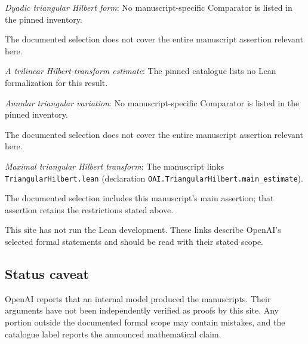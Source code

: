 \documentclass[11pt]{article}
\begin{document}
\textit{Dyadic triangular Hilbert form}: No manuscript-specific Comparator is listed in the pinned inventory.

The documented selection does not cover the entire manuscript assertion relevant here.

\textit{A trilinear Hilbert-transform estimate}: The pinned catalogue lists no Lean formalization for this result.

\textit{Annular triangular variation}: No manuscript-specific Comparator is listed in the pinned inventory.

The documented selection does not cover the entire manuscript assertion relevant here.

\textit{Maximal triangular Hilbert transform}: The manuscript links \texttt{TriangularHilbert.lean} (declaration \texttt{OAI.TriangularHilbert.main\_estimate}).

The documented selection includes this manuscript’s main assertion; that assertion retains the restrictions stated above.

This site has not run the Lean development. These links describe OpenAI’s selected formal statements and should be read with their stated scope.

\subsection{Status caveat}
OpenAI reports that an internal model produced the manuscripts. Their arguments have not been independently verified as proofs by this site. Any portion outside the documented formal scope may contain mistakes, and the catalogue label reports the announced mathematical claim.
\end{document}
